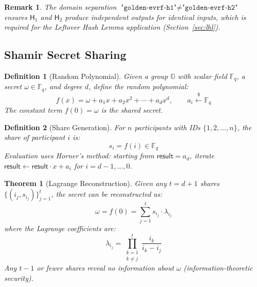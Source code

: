 \documentclass[11pt,a4paper]{article}
\newtheorem{definition}{Definition}[section]
\newtheorem{theorem}{Theorem}[section]
\newtheorem{remark}{Remark}[section]
\newcommand{\F}{\mathbb{F}}
\newcommand{\G}{\mathbb{G}}
\newcommand{\hashcurve}{\mathsf{H}}
\newcommand{\getsr}{\xleftarrow{\$}}
\begin{document}
\begin{remark}
  The domain separation $\texttt{"golden-evrf-h1"} \ne \texttt{"golden-evrf-h2"}$
  ensures $\hashcurve_1$ and $\hashcurve_2$ produce independent outputs for
  identical inputs, which is required for the Leftover Hash Lemma application
  (Section~\ref{sec:lhl}).
\end{remark}

\subsection{Shamir Secret Sharing}
\label{sec:shamir}

\begin{definition}[Random Polynomial]
  \label{def:polynomial}
  Given a group $\G$ with scalar field $\F_q$, a secret
  $\omega \in \F_q$, and degree $d$, define the random polynomial:
  \begin{equation}
    f(x) = \omega + a_1 x + a_2 x^2 + \cdots + a_d x^d, \qquad a_i \getsr \F_q
  \end{equation}
  The constant term $f(0) = \omega$ is the shared secret.
\end{definition}

\begin{definition}[Share Generation]
  \label{def:shares}
  For $n$ participants with IDs $\{1, 2, \ldots, n\}$, the share of participant
  $i$ is:
  \begin{equation}
    s_i = f(i) \in \F_q
  \end{equation}
  Evaluation uses Horner's method: starting from $\mathsf{result} = a_d$, iterate
  $\mathsf{result} \leftarrow \mathsf{result} \cdot x + a_{i}$ for
  $i = d-1, \ldots, 0$.
\end{definition}

\begin{theorem}[Lagrange Reconstruction]
  \label{thm:lagrange}
  Given any $t = d + 1$ shares $\{(i_j, s_{i_j})\}_{j=1}^{t}$, the secret can
  be reconstructed as:
  \begin{equation}
    \omega = f(0) = \sum_{j=1}^{t} s_{i_j} \cdot \lambda_{i_j}
    \label{eq:lagrange}
  \end{equation}
  where the Lagrange coefficients are:
  \begin{equation}
    \lambda_{i_j} = \prod_{\substack{k=1 \\ k \ne j}}^{t}
      \frac{i_k}{i_k - i_j}
    \label{eq:lagrange-coeff}
  \end{equation}
  Any $t-1$ or fewer shares reveal no information about $\omega$
  (information-theoretic security).
\end{theorem}
\end{document}
